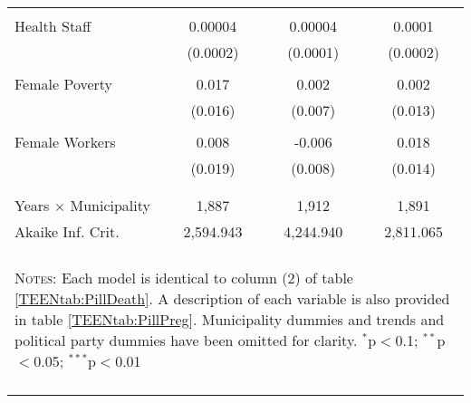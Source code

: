 \begin{table}[htpb!]
\begin{tabular}{@{\extracolsep{5pt}}lccc}
  & & & \\ 
  Health Staff & 0.00004 & 0.00004 & 0.0001 \\ 
  & (0.0002) & (0.0001) & (0.0002) \\ 
  & & & \\ 
  Female Poverty & 0.017 & 0.002 & 0.002 \\ 
  & (0.016) & (0.007) & (0.013) \\ 
  & & & \\ 
  Female Workers & 0.008 & -0.006 & 0.018 \\ 
  & (0.019) & (0.008) & (0.014) \\ 
  & & & \\ 
 \hline \\[-1.8ex] 
Years $\times$ Municipality & \multicolumn{1}{c}{1,887} & \multicolumn{1}{c}{1,912} & \multicolumn{1}{c}{1,891} \\ 
Akaike Inf. Crit. & \multicolumn{1}{c}{2,594.943} & \multicolumn{1}{c}{4,244.940} & \multicolumn{1}{c}{2,811.065} \\ 
\hline 
\hline \\[-1.8ex] 
\multicolumn{4}{p{10.8cm}}{\begin{footnotesize} \textsc{Notes:} Each model is identical to 
          column (2) of table \ref{TEENtab:PillDeath}.  A description of each 
          variable is also provided in table \ref{TEENtab:PillPreg}.  Municipality
          dummies and trends and political party dummies have been omitted for 
          clarity. $^{*}$p$<$0.1; $^{**}$p$<$0.05; $^{***}$p$<$0.01 
          \end{footnotesize}} \\ 
\normalsize 
\end{tabular} 
\end{table} 

